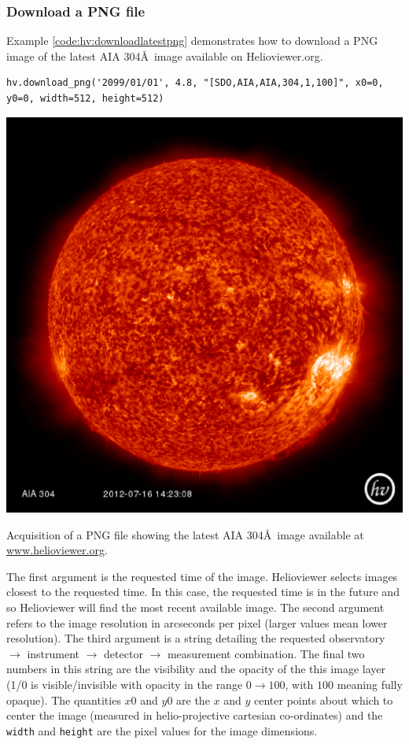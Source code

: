 \subsubsection{Download a PNG file}\label{sssec:hv:png}

Example \ref{code:hv:downloadlatestpng} demonstrates how to download a
PNG image of the latest AIA 304\AA\ image available on
Helioviewer.org.

\begin{listing}
\begin{verbatim}
hv.download_png('2099/01/01', 4.8, "[SDO,AIA,AIA,304,1,100]", x0=0, y0=0, width=512, height=512)
\end{verbatim}
\includegraphics[width=0.8\columnwidth]{helioviewer_latest_aia_304.eps}
\caption{Acquisition of a PNG file showing the latest AIA 304\AA\ image 
available at \url{www.helioviewer.org}.}
\label{code:hv:downloadlatestpng}
\end{listing}

The first argument is the requested time of the image.  Helioviewer
selects images closest to the requested time.  In this case, the
requested time is in the future and so Helioviewer will find the most
recent available image.  The second argument refers to the image
resolution in arcseconds per pixel (larger values mean lower
resolution).  The third argument is a string detailing the requested
observatory $\rightarrow$ instrument $\rightarrow$ detector
$\rightarrow$ measurement combination.  The final two numbers in this
string are the visibility and the opacity of the this image layer (1/0
is visible/invisible with opacity in the range $0\rightarrow100$, with
$100$ meaning fully opaque).  The quantities $x0$ and $y0$ are the $x$
and $y$ center points about which to center the image (measured in
helio-projective cartesian co-ordinates) and the \texttt{width} and
\texttt{height} are the pixel values for the image dimensions.

